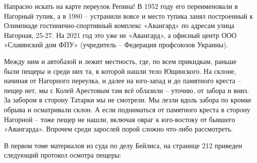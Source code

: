 Напрасно искать на карте переулок Репина! В 1952 году его переименовали в Нагорный тупик, а в 1980 – устранили вовсе и место тупика занял построенный к Олимпиаде гостинично-спортивный комплекс «Авангард» по адресам улица Нагорная, 25-27. На 2021 год это уже не «Авангард», а офисный центр ООО «Славянский дом ФПУ» (учредитель – Федерация профсоюзов Украины).

Между ним и автобазой и лежит местность, где, по всем прикидкам, раньше были пещеры и среди них та, в которой нашли тело Ющинского. На склоне, начиная от Нагорного переулка, и далее на юго-запад и до памятного креста – пещер нет, мы с Колей Арестовым там всё облазили – уточню, от забора и вниз. За забором в сторону Татарки мы не смотрели. Мы лезли вдоль забора по кромке обрыва и осматривали склон. А если подниматься от памятного креста в сторону Нагорной – тоже пещер не нашли, включая овраг к юго-востоку от бывшего «Авангарда». Впрочем среди зарослей порой сложно что-либо рассмотреть.

В первом томе материалов из суда по делу Бейлиса, на странице 212 приведен следующий протокол осмотра пещеры:


